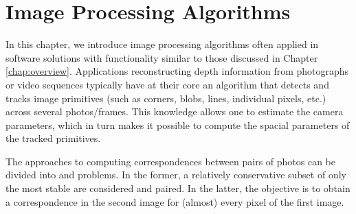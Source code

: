 








\chapter{Image Processing Algorithms}

In this chapter, we introduce image processing algorithms often applied in software solutions with functionality similar to those discussed in Chapter \ref{chap:overview}. %
Applications reconstructing depth information from photographs or video sequences typically have at their core an algorithm that detects and tracks image primitives (such as corners, blobs, lines, individual pixels, etc.) across several photos/frames. 
This knowledge allows one to estimate the camera parameters, which in turn makes it possible to compute the spacial parameters of the tracked primitives.

The approaches to computing correspondences between pairs of photos can be divided into  and  problems. %
In the former, a relatively conservative subset of only the most stable  are considered and paired. %
In the latter, the objective is to obtain a correspondence in the second image for (almost) every pixel of the first image. 

